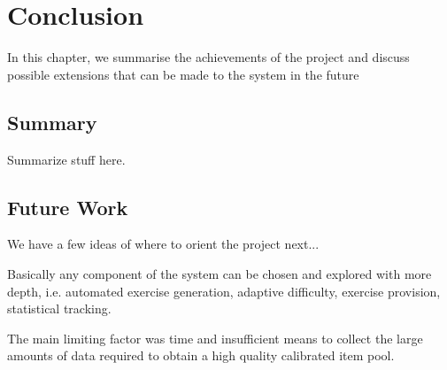 \chapter{Conclusion}
In this chapter, we summarise the achievements of the project and discuss possible extensions that can be made to the system in the future

\section{Summary}
Summarize stuff here.

\section{Future Work}
We have a few ideas of where to orient the project next...\newline

Basically any component of the system can be chosen and explored with more depth, i.e. automated exercise generation, adaptive difficulty, exercise provision, statistical tracking.

The main limiting factor was time and insufficient means to collect the large amounts of data required to obtain a high quality calibrated item pool.

